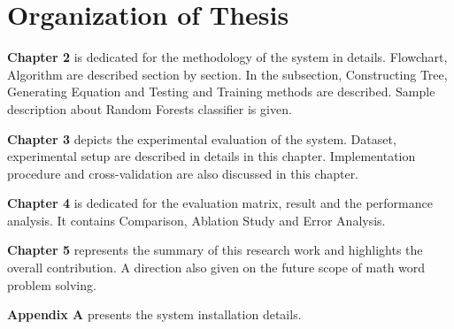 \documentclass[document.tex]{subfiles}
\begin{document}
\section{Organization of Thesis}
\noindent \textbf{Chapter 2} is dedicated for the methodology of the system in details. Flowchart, Algorithm are described section by section. In the subsection, Constructing Tree, Generating Equation and Testing and Training methods are described. Sample description about Random Forests classifier is given.

\noindent \textbf{Chapter 3} depicts the experimental evaluation of the system. Dataset, experimental setup are described in details in this chapter. Implementation procedure and cross-validation are also discussed in this chapter.


\noindent \textbf{Chapter 4} is dedicated for the evaluation matrix, result and the performance analysis. It contains Comparison, Ablation Study and Error Analysis.


\noindent \textbf{Chapter 5} represents the summary of this research work and highlights the overall contribution. A direction also given on the future scope of math word problem solving.


\noindent \textbf{Appendix A} presents the system installation details.
\end{document}
